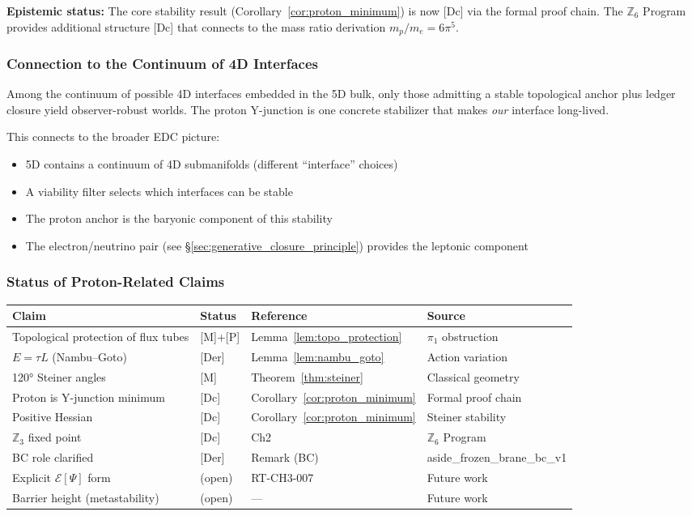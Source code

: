 \noindent
\textbf{Epistemic status:} The core stability result (Corollary~\ref{cor:proton_minimum}) is now
[Dc] via the formal proof chain. The $\mathbb{Z}_6$ Program provides additional structure [Dc]
that connects to the mass ratio derivation $m_p/m_e = 6\pi^5$.

\subsubsection{Connection to the Continuum of 4D Interfaces}

Among the continuum of possible 4D interfaces embedded in the 5D bulk, only those admitting a stable
topological anchor plus ledger closure yield observer-robust worlds. The proton Y-junction is one
concrete stabilizer that makes \emph{our} interface long-lived.

This connects to the broader EDC picture:
\begin{itemize}[nosep]
  \item 5D contains a continuum of 4D submanifolds (different ``interface'' choices)
  \item A viability filter selects which interfaces can be stable
  \item The proton anchor is the baryonic component of this stability
  \item The electron/neutrino pair (see \S\ref{sec:generative_closure_principle}) provides the leptonic component
\end{itemize}

\subsubsection{Status of Proton-Related Claims}
\label{sec:proton_open_targets}

\begin{center}
\begin{tabular}{llll}
\toprule
\textbf{Claim} & \textbf{Status} & \textbf{Reference} & \textbf{Source} \\
\midrule
Topological protection of flux tubes & [M]+[P] & Lemma~\ref{lem:topo_protection} & $\pi_1$ obstruction \\
$E = \tau L$ (Nambu--Goto) & [Der] & Lemma~\ref{lem:nambu_goto} & Action variation \\
120° Steiner angles & [M] & Theorem~\ref{thm:steiner} & Classical geometry \\
Proton is Y-junction minimum & [Dc] & Corollary~\ref{cor:proton_minimum} & Formal proof chain \\
Positive Hessian & [Dc] & Corollary~\ref{cor:proton_minimum} & Steiner stability \\
\midrule
$\mathbb{Z}_3$ fixed point & [Dc] & Ch2 & $\mathbb{Z}_6$ Program \\
BC role clarified & [Der] & Remark (BC) & aside\_frozen\_brane\_bc\_v1 \\
\midrule
Explicit $\mathcal{E}[\Psi]$ form & (open) & RT-CH3-007 & Future work \\
Barrier height (metastability) & (open) & --- & Future work \\
\bottomrule
\end{tabular}
\end{center}


